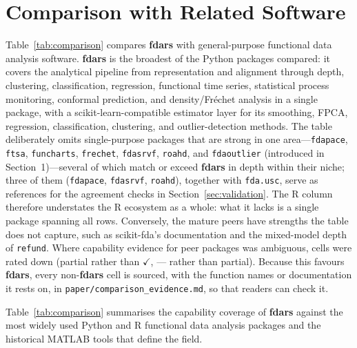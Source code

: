 \section{Comparison with Related Software}
\label{sec:comparison}

Table~\ref{tab:comparison} compares \textbf{fdars} with general-purpose
functional data analysis software.  \textbf{fdars} is the broadest of the
Python packages compared: it covers the analytical pipeline from representation
and alignment through depth, clustering, classification, regression, functional
time series, statistical process monitoring, conformal prediction, and
density/Fr\'{e}chet analysis in a single package, with a scikit-learn-compatible
estimator layer for its smoothing, FPCA, regression, classification,
clustering, and outlier-detection methods.  The table deliberately omits single-purpose packages that are strong in
one area---\texttt{fdapace}, \texttt{ftsa}, \texttt{funcharts},
\texttt{frechet}, \texttt{fdasrvf}, \texttt{roahd}, and \texttt{fdaoutlier}
(introduced in Section~1)---several of which match or exceed \textbf{fdars} in
depth within their niche; three of them (\texttt{fdapace}, \texttt{fdasrvf},
\texttt{roahd}), together with \texttt{fda.usc}, serve as references for the
agreement checks in Section~\ref{sec:validation}.  The R column therefore understates the
R ecosystem as a whole: what it lacks is a single package spanning all rows.  Conversely, the mature peers have strengths the table
does not capture, such as scikit-fda's documentation and the mixed-model depth
of \texttt{refund}.
Where capability evidence for peer packages was ambiguous, cells were rated
down (partial rather than $\checkmark$, --- rather than partial).  Because this
favours \textbf{fdars}, every non-\textbf{fdars} cell is sourced, with the
function names or documentation it rests on, in
\texttt{paper/comparison\_evidence.md}, so that readers can check it.

Table~\ref{tab:comparison} summarises the capability coverage of \textbf{fdars}
against the most widely used Python and R functional data analysis packages and
the historical MATLAB tools that define the field.


